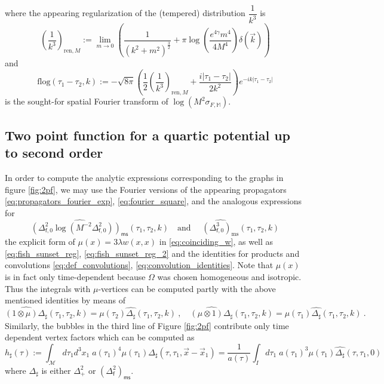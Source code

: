 \documentclass[12pt]{book}
\newcommand{\ms}{\mathsf{ms}}
\let\int\int
\newcommand{\Mcal}{\mathcal{M}}
\newcommand{\Mbb}{\mathbb{M}}
\newcommand{\fsf}{\mathsf{f}}
\theoremstyle{break}
\begin{document}
%
where the appearing regularization of the (tempered) distribution $\dfrac{1}{k^3}$ is 
%
\begin{equation}
\left(\frac{1}{k^3}\right)_{\text{ren},M}:=\lim_{m\to 0}\left(\frac{1}{(k^2+m^2)^{\frac32}}+\pi\log\left(\frac{e^{4\gamma}m^4}{4 M^4}\right)\delta(\vec{k})\right)
\label{eq:regk3}
\end{equation}
and
\begin{equation}
\text{flog}(\tau_1-\tau_2,k):=-\sqrt{8\pi}\left(\frac{1}{2}\left(\frac{1}{k^3}\right)_{\text{ren},M}+\frac{i|\tau_1-\tau_2|}{2k^2}\right)e^{-ik|\tau_1-\tau_2|}
\label{eq:flog}
\end{equation}
%
is the sought-for spatial Fourier transform of $\log \left(M^2 \sigma_{F,\Mbb}\right)$. 

\subsection{Two point function for a quartic potential up to second order}


In order to compute the analytic expressions corresponding to the graphs in figure \ref{fig:2pf}, we may use the Fourier versions of the appearing propagators \eqref{eq:propagators_fourier_exp}, \eqref{eq:fourier_square}, and the analogous expressions for 
%
\begin{equation*}
\widehat{\left(\Delta^2_{\fsf,0}\log\left(M^{-2}\Delta^2_{\fsf,0}\right) \right)_\ms}(\tau_1,\tau_2,k) \quad \mbox{and } \quad \widehat{\left(\Delta^3_{\fsf,0}\right)_\text{ms}}(\tau_1,\tau_2,k)
\end{equation*}
%
the explicit form of $\mu(x)=3\lambda w(x,x)$ in \eqref{eq:coinciding_w}, as well as \eqref{eq:fish_sunset_reg}, \eqref{eq:fish_sunset_reg_2} and the identities for products and convolutions \eqref{eq:def_convolutions}, \eqref{eq:convolution_identities}. Note that $\mu(x)$ is in fact only time-dependent because $\Omega$ was chosen homogeneous and isotropic. Thus the integrals with $\mu$-vertices can be computed partly with the above mentioned identities by means of 
%
\begin{equation*}
\widehat{(1\otimes \mu) \Delta_{\sharp}}(\tau_1,\tau_2,k)=\mu(\tau_2)\widehat{\Delta_{\sharp}}(\tau_1,\tau_2,k) \ , \quad\widehat{(\mu\otimes 1) \Delta_{\sharp}}(\tau_1,\tau_2,k)=\mu(\tau_1)\widehat{\Delta_{\sharp}}(\tau_1,\tau_2,k) \ . 
\end{equation*}
%
Similarly, the bubbles in the third line of Figure \ref{fig:2pf} contribute only time dependent vertex factors which can be computed as 
%
\begin{equation*}
h_\sharp(\tau):=\int_\Mcal d\tau_1 d^3x_1\; a(\tau_1)^4\mu(\tau_1)\Delta_\sharp(\tau,\tau_1,\vec{x}-\vec{x}_1)=\frac{1}{a(\tau)}\int_I d\tau_1\;a(\tau_1)^3 \mu(\tau_1)\widehat{\Delta_\sharp}(\tau,\tau_1,0) 
\end{equation*}
%
where $\Delta_\sharp$ is either $\Delta^2_+$ or $\left(\Delta^2_\fsf\right)_\ms$.
\end{document}
